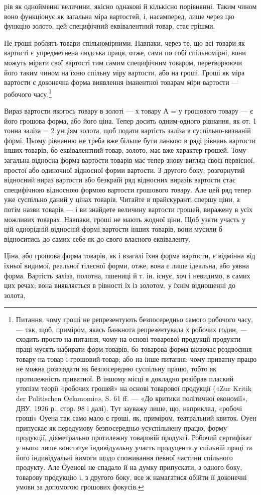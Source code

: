 рів як однойменні величини, якісно однакові й кількісно порівнянні.
Таким чином воно функціонує як загальна міра вартостей,
і, насамперед, лише через цю функцію золото, цей специфічний
еквівалентний товар, стає грішми.

Не гроші роблять товари спільномірними. Навпаки, через
те, що всі товари як вартості є упредметнена людська праця, отже,
сами по собі спільномірні, вони можуть міряти свої вартості
тим самим специфічним товаром, перетворюючи його таким чином
на їхню спільну міру вартости, або на гроші. Гроші як міра
вартости є доконечна форма виявлення іманентної товарам міри
вартости — робочого часу.\footnote{
Питання, чому гроші не репрезентують безпосередньо самого робочого
часу, — так, щоб, приміром, якась банкнота репрезентувала х робочих
годин, — сходить просто на питання, чому на основі товарової продукції
продукти праці мусять набирати форм товарів, бо товарова форма
включає роздвоєння товару на товар і грошовий товар; або на інше питання:
чому приватну працю не можна розглядати як безпосередню суспільну
працю, тобто як протилежність приватної. В іншому місці я докладно
розібрав плаский утопізм теорії «робочих грошей» на основі товарової
продукції («Zur Kritik der Politischen Oekonomie», S. 61 ff. — «До критики
політичної економії», ДВУ, 1926 р., стор. 98 і далі). Тут зауважу лише,
що, наприклад, «робочі гроші» Оуена так само мало є гроші, як, приміром,
театральний квиток. Оуен припускає як передумову безпосередньо
усуспільнену працю, форму продукції, діяметрально протилежну товаровій
продукті. Робочий сертифікат у нього лише констатує індивідуальну
участь продуцента у спільній праці та його індивідуальні вимоги щодо споживання
певної частини спільного продукту. Але Оуенові не спадало й на
думку припускати, з одного боку, товарову продукцію і, з другого боку, все ж
намагатися обійти її доконечні умови за допомогою грошових фокусів.
}

Вираз вартости якогось товару в золоті — х товару А = у
грошового товару — є його грошова форма, або його ціна. Тепер
досить одним-одного рівнання, як от: 1 тонна заліза = 2 унціям
золота, щоб подати вартість заліза в суспільно-визнаній формі.
Цьому рівнанню не треба вже більше бути ланкою в ряді рівнань
вартости інших товарів, бо еквівалентний товар, золото, має
вже характер грошей. Тому загальна відносна форма вартости
товарів має тепер знову вигляд своєї первісної, простої або одиночної
відносної форми вартости. З другого боку, розгорнутий
відносний вираз вартости або безкраїй ряд відносних виразів
вартости стає специфічною відносною формою вартости грошового
товару. Але цей ряд тепер уже суспільно даний у цінах
товарів. Читайте в прайскуранті спершу ціни, а потім назви
товарів — і ви знайдете величину вартости грошей, виражену
в усіх можливих товарах. Навпаки, гроші не мають жодної
ціни. Щоб узяти участь у цій однорідній відносній формі вартости
інших товарів, вони мусили б відноситись до самих себе як до
свого власного еквіваленту.

Ціна, або грошова форма товарів, як і взагалі їхня форма вартости,
є відмінна від їхньої видимої, реальної тілесної форми, отже,
вона є лише ідеальна, або уявна форма. Вартість заліза, полотна,
пшениці й т. ін. існує, хоч і невидимо, в самих цих речах; вона
виявляється в рівності їх із золотом, у їхнім відношенні до золота,